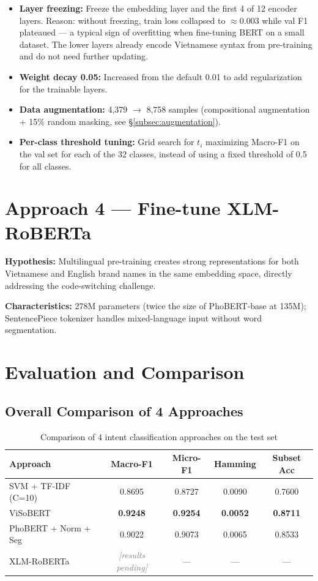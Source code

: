 \documentclass[12pt, a4paper]{report}
\newcommand{\placeholder}[1]{\textit{\textcolor{gray}{[#1]}}}
\begin{document}
\begin{itemize}
  \item \textbf{Layer freezing:} Freeze the embedding layer and the first 4 of 12 encoder layers.
        Reason: without freezing, train loss collapsed to $\approx 0.003$
        while val F1 plateaued --- a typical sign of overfitting when fine-tuning BERT
        on a small dataset. The lower layers already encode Vietnamese syntax
        from pre-training and do not need further updating.
  \item \textbf{Weight decay 0.05:} Increased from the default 0.01
        to add regularization for the trainable layers.
  \item \textbf{Data augmentation:} 4,379 $\rightarrow$ 8,758 samples
        (compositional augmentation + 15\% random masking, see \S\ref{subsec:augmentation}).
  \item \textbf{Per-class threshold tuning:} Grid search for $t_i$
        maximizing Macro-F1 on the val set for each of the 32 classes,
        instead of using a fixed threshold of 0.5 for all classes.
\end{itemize}

\section{Approach 4 --- Fine-tune XLM-RoBERTa}

\textbf{Hypothesis:} Multilingual pre-training creates strong representations
for both Vietnamese and English brand names in the same embedding space,
directly addressing the code-switching challenge.

\textbf{Characteristics:} 278M parameters (twice the size of PhoBERT-base at 135M);
SentencePiece tokenizer handles mixed-language input without word segmentation.

\section{Evaluation and Comparison}

\subsection{Overall Comparison of 4 Approaches}

\begin{table}[H]
\centering
\caption{Comparison of 4 intent classification approaches on the test set}
\label{tab:intent_compare}
\begin{tabular}{lcccc}
\toprule
\textbf{Approach} & \textbf{Macro-F1} & \textbf{Micro-F1} & \textbf{Hamming} & \textbf{Subset Acc} \\
\midrule
SVM + TF-IDF (C=10)   & 0.8695 & 0.8727 & 0.0090 & 0.7600 \\
ViSoBERT              & \textbf{0.9248} & \textbf{0.9254} & \textbf{0.0052} & \textbf{0.8711} \\
PhoBERT + Norm + Seg  & 0.9022 & 0.9073 & 0.0065 & 0.8533 \\
XLM-RoBERTa           & \placeholder{results pending} & --- & --- & --- \\
\bottomrule
\end{tabular}
\end{table}
\end{document}

